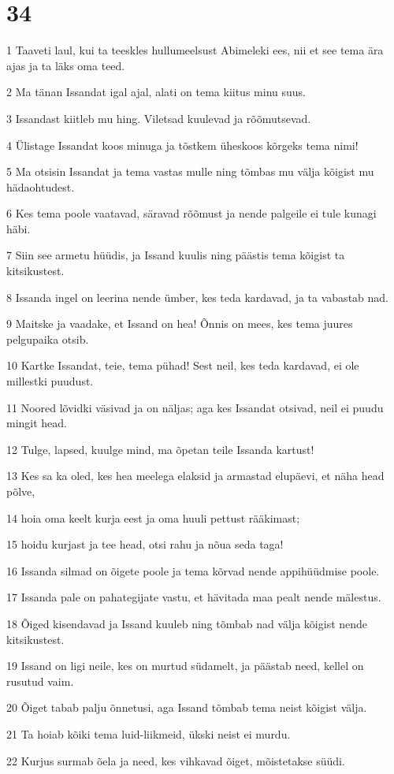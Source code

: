 \chapter{34}

\par 1 Taaveti laul, kui ta teeskles hullumeelsust Abimeleki ees, nii et see tema ära ajas ja ta läks oma teed.
\par 2 Ma tänan Issandat igal ajal, alati on tema kiitus minu suus.
\par 3 Issandast kiitleb mu hing. Viletsad kuulevad ja rõõmutsevad.
\par 4 Ülistage Issandat koos minuga ja tõstkem üheskoos kõrgeks tema nimi!
\par 5 Ma otsisin Issandat ja tema vastas mulle ning tõmbas mu välja kõigist mu hädaohtudest.
\par 6 Kes tema poole vaatavad, säravad rõõmust ja nende palgeile ei tule kunagi häbi.
\par 7 Siin see armetu hüüdis, ja Issand kuulis ning päästis tema kõigist ta kitsikustest.
\par 8 Issanda ingel on leerina nende ümber, kes teda kardavad, ja ta vabastab nad.
\par 9 Maitske ja vaadake, et Issand on hea! Õnnis on mees, kes tema juures pelgupaika otsib.
\par 10 Kartke Issandat, teie, tema pühad! Sest neil, kes teda kardavad, ei ole millestki puudust.
\par 11 Noored lõvidki väsivad ja on näljas; aga kes Issandat otsivad, neil ei puudu mingit head.
\par 12 Tulge, lapsed, kuulge mind, ma õpetan teile Issanda kartust!
\par 13 Kes sa ka oled, kes hea meelega elaksid ja armastad elupäevi, et näha head põlve,
\par 14 hoia oma keelt kurja eest ja oma huuli pettust rääkimast;
\par 15 hoidu kurjast ja tee head, otsi rahu ja nõua seda taga!
\par 16 Issanda silmad on õigete poole ja tema kõrvad nende appihüüdmise poole.
\par 17 Issanda pale on pahategijate vastu, et hävitada maa pealt nende mälestus.
\par 18 Õiged kisendavad ja Issand kuuleb ning tõmbab nad välja kõigist nende kitsikustest.
\par 19 Issand on ligi neile, kes on murtud südamelt, ja päästab need, kellel on rusutud vaim.
\par 20 Õiget tabab palju õnnetusi, aga Issand tõmbab tema neist kõigist välja.
\par 21 Ta hoiab kõiki tema luid-liikmeid, ükski neist ei murdu.
\par 22 Kurjus surmab õela ja need, kes vihkavad õiget, mõistetakse süüdi.

